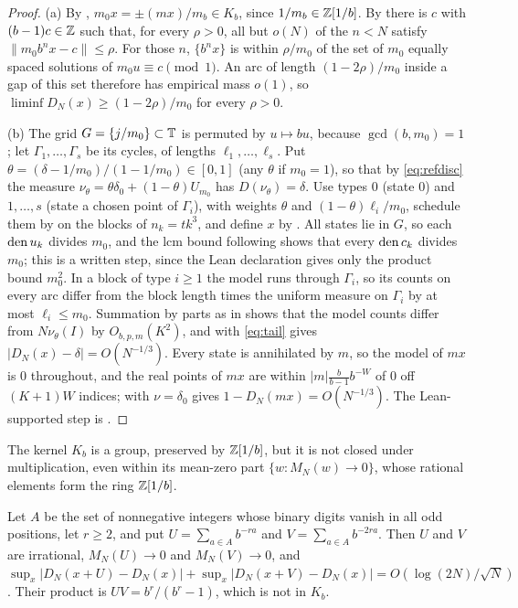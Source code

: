 \documentclass[11pt]{article}
\newcommand{\dist}[1]{\lVert #1\rVert}
\newcommand{\fr}[1]{\{#1\}}
\begin{document}
\begin{proof}
(a) By , $m_0x=\pm(mx)/m_b\in K_b$, since $1/m_b\in\mathbb Z[1/b]$. By
 there is $c$ with $(b-1)c\in\mathbb Z$ such that, for every $\rho>0$, all but $o(N)$ of the
$n<N$ satisfy $\dist{m_0b^nx-c}\le\rho$. For those $n$, $\fr{b^nx}$ is within $\rho/m_0$ of the set of
$m_0$ equally spaced solutions of $m_0u\equiv c\pmod1$. An arc of length $(1-2\rho)/m_0$ inside a gap of
this set therefore has empirical mass $o(1)$, so $\liminf D_N(x)\ge(1-2\rho)/m_0$ for every $\rho>0$.

(b) The grid $G=\{j/m_0\}\subset\mathbb T$ is permuted by $u\mapsto bu$, because $\gcd(b,m_0)=1$; let
$\Gamma_1,\ldots,\Gamma_s$ be its cycles, of lengths $\ell_1,\ldots,\ell_s$. Put
$\theta=(\delta-1/m_0)/(1-1/m_0)\in[0,1]$ (any $\theta$ if $m_0=1$), so that by \eqref{eq:refdisc} the
measure $\nu_\theta=\theta\delta_0+(1-\theta)U_{m_0}$ has $D(\nu_\theta)=\delta$. Use types $0$ (state $0$)
and $1,\ldots,s$ (state a chosen point of $\Gamma_i$), with weights $\theta$ and $(1-\theta)\ell_i/m_0$,
schedule them by  on the blocks of $n_k=tk^3$, and define $x$ by .
All states lie in $G$, so each $\operatorname{den} u_k$ divides $m_0$, and the $\mathrm{lcm}$ bound following
 shows that every $\operatorname{den} c_k$ divides $m_0$; this is a written step, since the Lean
declaration gives only the product bound $m_0^2$. In a block of type $i\ge1$ the model runs through
$\Gamma_i$, so its counts on every arc differ from the block length times the uniform measure on
$\Gamma_i$ by at most $\ell_i\le m_0$. Summation by parts as in  shows that the
model counts differ from $N\nu_\theta(I)$ by $O_{b,p,m}(K^2)$, and  with \eqref{eq:tail}
gives $|D_N(x)-\delta|=O(N^{-1/3})$. Every state is annihilated by $m$, so the model of $mx$ is $0$
throughout, and the real points of $mx$ are within $|m|\frac b{b-1}b^{-W}$ of $0$ off $(K+1)W$ indices;
 with $\nu=\delta_0$ gives $1-D_N(mx)=O(N^{-1/3})$. The Lean-supported step is
.
\end{proof}

The kernel $K_b$ is a group, preserved by $\mathbb Z[1/b]$, but it is not closed under multiplication, even
within its mean-zero part $\{w:M_N(w)\to0\}$, whose rational elements form the ring $\mathbb Z[1/b]$.

\begin{proposition}\label{prop:product}
Let $A$ be the set of nonnegative integers whose binary digits vanish in all odd positions, let $r\ge2$,
and put $U=\sum_{a\in A}b^{-ra}$ and $V=\sum_{a\in A}b^{-2ra}$. Then $U$ and $V$ are irrational,
$M_N(U)\to0$ and $M_N(V)\to0$, and $\sup_x|D_N(x+U)-D_N(x)|+\sup_x|D_N(x+V)-D_N(x)|=O(\log(2N)/\sqrt N)$. Their product
is $UV=b^r/(b^r-1)$, which is not in $K_b$.
\end{proposition}
\end{document}
